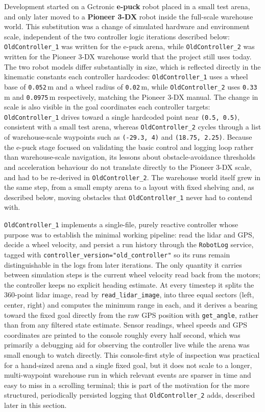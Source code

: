 Development started on a Gctronic \textbf{e-puck} robot placed in a small test arena, and only later moved to a \textbf{Pioneer 3-DX} robot inside the full-scale warehouse world. This substitution was a change of simulated hardware and environment scale, independent of the two controller logic iterations described below: \texttt{OldController\_1} was written for the e-puck arena, while \texttt{OldController\_2} was written for the Pioneer 3-DX warehouse world that the project still uses today. The two robot models differ substantially in size, which is reflected directly in the kinematic constants each controller hardcodes: \texttt{OldController\_1} uses a wheel base of \texttt{0.052}\,m and a wheel radius of \texttt{0.02}\,m, while \texttt{OldController\_2} uses \texttt{0.33}\,m and \texttt{0.0975}\,m respectively, matching the Pioneer 3-DX manual. The change in scale is also visible in the goal coordinates each controller targets: \texttt{OldController\_1} drives toward a single hardcoded point near \texttt{(0.5, 0.5)}, consistent with a small test arena, whereas \texttt{OldController\_2} cycles through a list of warehouse-scale waypoints such as \texttt{(-29.3, 4)} and \texttt{(18.75, 2.25)}. Because the e-puck stage focused on validating the basic control and logging loop rather than warehouse-scale navigation, its lessons about obstacle-avoidance thresholds and acceleration behaviour do not translate directly to the Pioneer 3-DX scale, and had to be re-derived in \texttt{OldController\_2}. The warehouse world itself grew in the same step, from a small empty arena to a layout with fixed shelving and, as described below, moving obstacles that \texttt{OldController\_1} never had to contend with.

\texttt{OldController\_1} implements a single-file, purely reactive controller whose purpose was to establish the minimal working pipeline: read the lidar and GPS, decide a wheel velocity, and persist a run history through the \texttt{RobotLog} service, tagged with \texttt{controller\_version="old\_controller"} so its runs remain distinguishable in the logs from later iterations. The only quantity it carries between simulation steps is the current wheel velocity read back from the motors; the controller keeps no explicit heading estimate. At every timestep it splits the 360-point lidar image, read by \texttt{read\_lidar\_image}, into three equal sectors (left, center, right) and computes the minimum range in each, and it derives a bearing toward the fixed goal directly from the raw GPS position with \texttt{get\_angle}, rather than from any filtered state estimate. Sensor readings, wheel speeds and GPS coordinates are printed to the console roughly every half second, which was primarily a debugging aid for observing the controller live while the arena was small enough to watch directly. This console-first style of inspection was practical for a hand-sized arena and a single fixed goal, but it does not scale to a longer, multi-waypoint warehouse run in which relevant events are sparser in time and easy to miss in a scrolling terminal; this is part of the motivation for the more structured, periodically persisted logging that \texttt{OldController\_2} adds, described later in this section.

